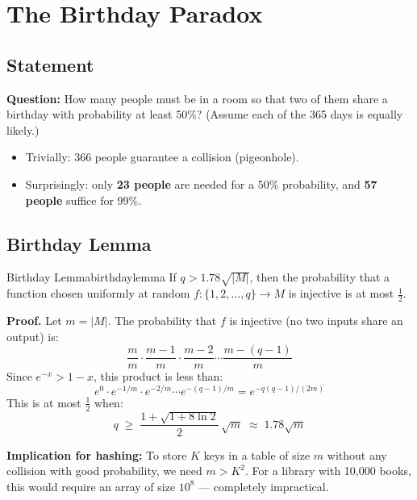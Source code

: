 \section*{The Birthday Paradox}

\subsection{Statement}

\textbf{Question:} How many people must be in a room so that two of them share a birthday
with probability at least 50\%? (Assume each of the 365 days is equally likely.)

\begin{itemize}[noitemsep]
  \item Trivially: 366 people guarantee a collision (pigeonhole).
  \item Surprisingly: only \textbf{23 people} are needed for a 50\% probability, and
        \textbf{57 people} suffice for 99\%.
\end{itemize}

\subsection{Birthday Lemma}

\begin{theorem}{Birthday Lemma}{birthdaylemma}
If $q > 1.78\sqrt{|M|}$, then the probability that a function chosen uniformly at random
$f:\{1, 2, \ldots, q\} \to M$ is injective is at most $\tfrac{1}{2}$.

\textbf{Proof.} Let $m = |M|$. The probability that $f$ is injective (no two inputs
share an output) is:
\[
  \frac{m}{m} \cdot \frac{m-1}{m} \cdot \frac{m-2}{m} \cdots \frac{m-(q-1)}{m}
\]
Since $e^{-x} > 1 - x$, this product is less than:
\[
  e^{0} \cdot e^{-1/m} \cdot e^{-2/m} \cdots e^{-(q-1)/m} = e^{-q(q-1)/(2m)}
\]
This is at most $\tfrac{1}{2}$ when:
\[
  q \;\ge\; \frac{1 + \sqrt{1 + 8\ln 2}}{2}\,\sqrt{m} \;\approx\; 1.78\sqrt{m}
\]
\end{theorem}

\textbf{Implication for hashing:} To store $K$ keys in a table of size $m$ without any
collision with good probability, we need $m > K^2$. For a library with 10{,}000 books,
this would require an array of size $10^8$ — completely impractical.

